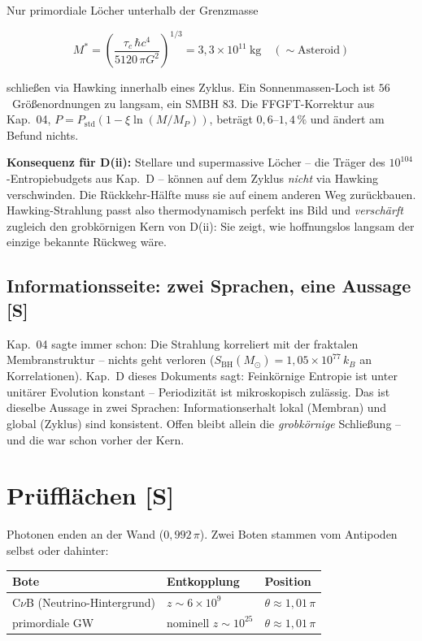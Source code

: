 \documentclass[11pt]{report}
\begin{document}
Nur primordiale Löcher unterhalb der Grenzmasse

\[
  M^{*} = \left(\frac{\tau_c\,\hbar c^4}{5120\,\pi G^2}\right)^{1/3}
  = 3{,}3\times10^{11}~\text{kg} \quad(\sim\text{Asteroid})
\]

schließen via Hawking innerhalb eines Zyklus. Ein
Sonnenmassen-Loch ist $56$~Größenordnungen zu langsam, ein SMBH
$83$. Die FFGFT-Korrektur aus Kap.~04,
$P = P_\text{std}(1 - \xi\ln(M/M_P))$, beträgt $0{,}6$--$1{,}4\,\%$
und ändert am Befund nichts.

\textbf{Konsequenz für D(ii):} Stellare und supermassive Löcher
-- die Träger des $10^{104}$-Entropiebudgets aus Kap.~D -- können
auf dem Zyklus \emph{nicht} via Hawking verschwinden. Die
Rückkehr-Hälfte muss sie auf einem anderen Weg zurückbauen.
Hawking-Strahlung passt also thermodynamisch perfekt ins Bild und
\emph{verschärft} zugleich den grobkörnigen Kern von D(ii): Sie
zeigt, wie hoffnungslos langsam der einzige bekannte Rückweg wäre.

\section{Informationsseite: zwei Sprachen, eine Aussage [S]}

Kap.~04 sagte immer schon: Die Strahlung korreliert mit der
fraktalen Membranstruktur -- nichts geht verloren
($S_\text{BH}(M_\odot) = 1{,}05\times10^{77}\,k_B$ an
Korrelationen). Kap.~D dieses Dokuments sagt: Feinkörnige Entropie
ist unter unitärer Evolution konstant -- Periodizität ist
mikroskopisch zulässig. Das ist dieselbe Aussage in zwei Sprachen:
Informationserhalt lokal (Membran) und global (Zyklus) sind
konsistent. Offen bleibt allein die \emph{grobkörnige}
Schließung -- und die war schon vorher der Kern.

\chapter{Prüfflächen [S]}

Photonen enden an der Wand ($0{,}992\,\pi$). Zwei Boten stammen
vom Antipoden selbst oder dahinter:

\begin{center}
\begin{tabular}{lll}
\toprule
Bote & Entkopplung & Position \\
\midrule
C$\nu$B (Neutrino-Hintergrund) & $z \sim 6\times10^{9}$ &
  $\theta \approx 1{,}01\,\pi$ \\
primordiale GW & nominell $z \sim 10^{25}$ &
  $\theta \approx 1{,}01\,\pi$ \\
\bottomrule
\end{tabular}
\end{center}
\end{document}
